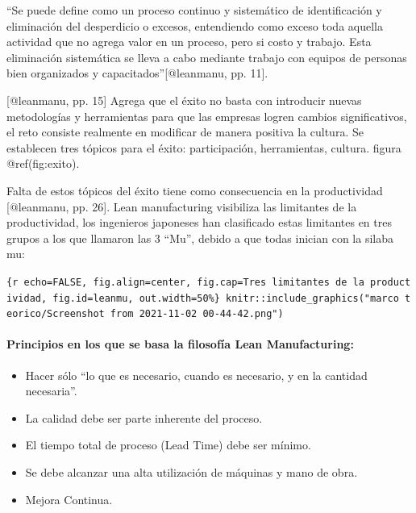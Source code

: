 \documentclass[11pt]{article}
\providecommand{\tightlist}{%
      \setlength{\itemsep}{0pt}\setlength{\parskip}{0pt}}
\begin{document}
``Se puede define como un proceso continuo y sistemático de
identificación y eliminación del desperdicio o excesos, entendiendo como
exceso toda aquella actividad que no agrega valor en un proceso, pero si
costo y trabajo. Esta eliminación sistemática se lleva a cabo mediante
trabajo con equipos de personas bien organizados y
capacitados''{[}@leanmanu, pp. 11{]}.

{[}@leanmanu, pp. 15{]} Agrega que el éxito no basta con introducir
nuevas metodologías y herramientas para que las empresas logren cambios
significativos, el reto consiste realmente en modificar de manera
positiva la cultura. Se establecen tres tópicos para el éxito:
participación, herramientas, cultura. figura @ref(fig:exito).

Falta de estos tópicos del éxito tiene como consecuencia en la
productividad {[}@leanmanu, pp. 26{]}. Lean manufacturing visibiliza las
limitantes de la productividad, los ingenieros japoneses han clasificado
estas limitantes en tres grupos a los que llamaron las 3 ``Mu'', debido
a que todas inician con la silaba mu:

\texttt{\{r\ echo=FALSE,\ fig.align=\textquotesingle{}center\textquotesingle{},\ fig.cap=\textquotesingle{}Tres\ limitantes\ de\ la\ productividad\textquotesingle{},\ fig.id=\textquotesingle{}leanmu\textquotesingle{},\ out.width=\textquotesingle{}50\%\textquotesingle{}\}\ knitr::include\_graphics("marco\ teorico/Screenshot\ from\ 2021-11-02\ 00-44-42.png")}

\hypertarget{principios-en-los-que-se-basa-la-filosofuxeda-lean-manufacturing}{%
\paragraph{Principios en los que se basa la filosofía Lean
Manufacturing:}\label{principios-en-los-que-se-basa-la-filosofuxeda-lean-manufacturing}}

\begin{itemize}
\tightlist
\item
  Hacer sólo ``lo que es necesario, cuando es necesario, y en la
  cantidad necesaria''.
\item
  La calidad debe ser parte inherente del proceso.
\item
  El tiempo total de proceso (Lead Time) debe ser mínimo.
\item
  Se debe alcanzar una alta utilización de máquinas y mano de obra.
\item
  Mejora Continua.
\end{itemize}
\end{document}
